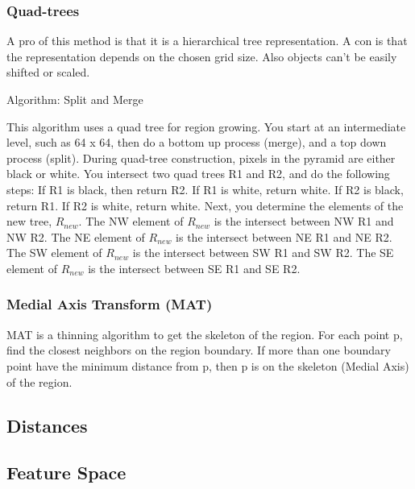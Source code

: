 \documentclass{article}
\begin{document}
\begin{multicols}{2}
 \subsubsection{Quad-trees}

  A pro of this method is that it is a hierarchical tree representation. A con is that the representation depends on the chosen grid size. Also objects can't be easily shifted or scaled.
  
  \vspace{5mm}

  Algorithm: Split and Merge

  \vspace{5mm}

  This algorithm uses a quad tree for region growing. You start at an intermediate level, such as 64 x 64, then do a bottom up process (merge), and a top down process (split).
  During quad-tree construction, pixels in the pyramid are either black or white.
  You intersect two quad trees R1 and R2, and do the following steps:
  If R1 is black, then return R2. If R1 is white, return white. If R2 is black, return R1. If R2 is white, return white.
  Next, you determine the elements of the new tree, $R_{new}$.
  The NW element of $R_{new}$ is the intersect between NW R1 and NW R2.
  The NE element of $R_{new}$ is the intersect between NE R1 and NE R2.
  The SW element of $R_{new}$ is the intersect between SW R1 and SW R2.
  The SE element of $R_{new}$ is the intersect between SE R1 and SE R2.

 \subsubsection{Medial Axis Transform (MAT)}


  MAT is a thinning algorithm to get the skeleton of the region.
  For each point p, find the closest neighbors on the region boundary.
  If more than one boundary point have the minimum distance from p, then p is on the skeleton (Medial Axis) of the region.

  \vspace{5mm}

  

\subsection{Distances}
\subsection{Feature Space}

\end{multicols}
\end{document}
